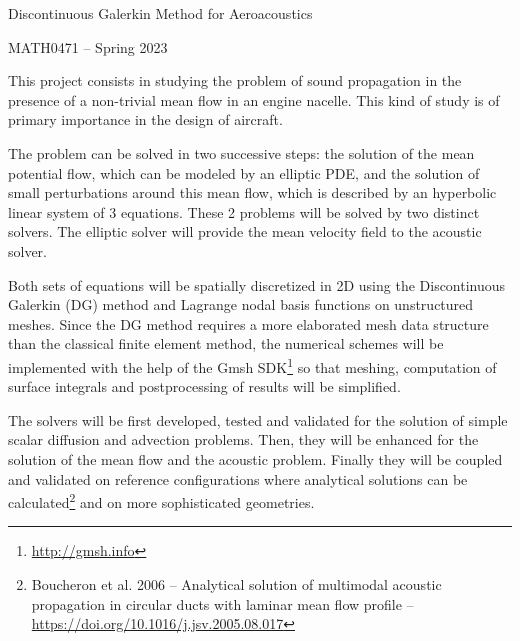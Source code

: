\documentclass[a4paper,12pt]{article}
\begin{document}
\begin{center} \Large Discontinuous Galerkin Method for Aeroacoustics
\end{center}

\begin{center}
MATH0471 -- Spring 2023 \bigskip
\end{center}

\bigskip

This project consists in studying the problem of sound propagation in the presence of a non-trivial mean flow in an engine nacelle. This kind of study is of primary importance in the design of aircraft. 

The problem can be solved in two successive steps: the solution of the mean potential flow, which can be modeled by an elliptic PDE, and the solution of small perturbations around this mean flow, which is described by an hyperbolic linear system of 3 equations. These 2 problems will be solved by two distinct solvers. The elliptic solver will provide the mean velocity field to the acoustic solver.

Both sets of equations will be spatially discretized in 2D using the Discontinuous Galerkin (DG) method and Lagrange nodal basis functions on unstructured meshes. 
Since the DG method requires a more elaborated mesh data structure than the
classical finite element method, the numerical schemes will be implemented with
the help of the Gmsh SDK\footnote{\url{http://gmsh.info}} so that meshing,
computation of surface integrals and postprocessing of results will be
simplified.

The solvers will be first developed, tested and validated for the solution of simple scalar diffusion and advection problems. Then, they will be enhanced for the solution of the mean flow and the acoustic problem. Finally they will be coupled and validated on reference configurations where analytical solutions can be calculated\footnote{Boucheron et al. 2006 -- Analytical solution of multimodal acoustic propagation in circular ducts with laminar mean flow profile -- \url{https://doi.org/10.1016/j.jsv.2005.08.017}} and on more sophisticated geometries. 
\end{document}
